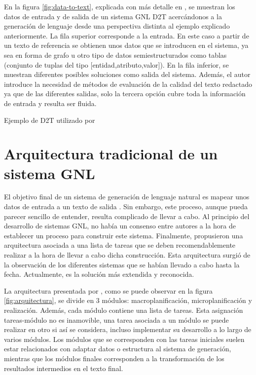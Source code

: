 En la figura \ref{fig:data-to-text}, explicada con más detalle en \cite{sai2020survey}, se muestran los datos de entrada y de salida de un sistema GNL D2T acercándonos a la generación de lenguaje desde una perspectiva distinta al ejemplo explicado anteriormente. La fila superior corresponde a la entrada. En este caso a partir de un texto de referencia se obtienen unos datos que se introducen en el sistema, ya sea en forma de grafo u otro tipo de datos semiestructurados como tablas (conjunto de tuplas del tipo [entidad,atributo,valor]). En la fila inferior, se muestran diferentes posibles soluciones como salida del sistema. Además, el autor introduce la necesidad de métodos de evaluación de la calidad del texto redactado ya que de las diferentes salidas, solo la tercera opción cubre toda la información de entrada y resulta ser fluida.

%
{Ejemplo de D2T utilizado por \cite{sai2020survey}}

\section{Arquitectura tradicional de un sistema GNL}
\label{sec:arquitectura_tradicional}
El objetivo final de un sistema de generación de lenguaje natural es mapear unos datos de entrada a un texto de salida \citep{reiter1997building}. Sin embargo, este proceso, aunque pueda parecer sencillo de entender, resulta complicado de llevar a cabo. Al principio del desarrollo de sistemas GNL, no había un consenso entre autores a la hora de establecer un proceso para construir este sistema. Finalmente, \cite{reiter1997building} propusieron una arquitectura asociada a una lista de tareas que se deben recomendablemente realizar a la hora de llevar a cabo dicha construcción. Esta arquitectura surgió de la observación de los diferentes sistemas que se habían llevado a cabo hasta la fecha.  Actualmente, es la solución más extendida y reconocida.

La arquitectura presentada por \cite{reiter1997building}, como se puede observar en la figura \ref{fig:arquitectura}, se divide en 3 módulos: macroplanificación, microplanificación y realización. Además, cada módulo contiene una lista de tareas. Esta asignación tareas-módulo no es inamovible, una tarea asociada a un módulo se puede realizar en otro si así se considera, incluso implementar su desarrollo a lo largo de varios módulos. Los módulos que se corresponden con las tareas iniciales suelen estar relacionados con adaptar datos o estructura al sistema de generación, mientras que los módulos finales corresponden a la transformación de los resultados intermedios en el texto final.

